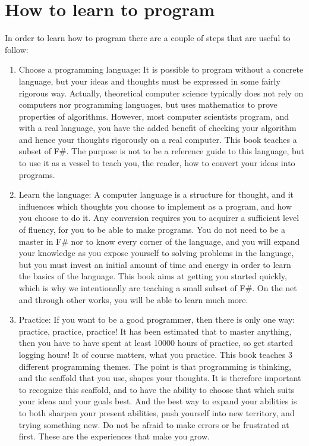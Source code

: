 \section{How to learn to program}
In order to learn how to program there are a couple of steps that are useful to follow:
\begin{enumerate}
\item Choose a programming language: It is possible to program without a concrete language, but your ideas and thoughts must be expressed in some fairly rigorous way. Actually, theoretical computer science typically does not rely on computers nor programming languages, but uses mathematics to prove properties of algorithms. However, most computer scientists program, and with a real language, you have the added benefit of checking your algorithm and hence your thoughts rigorously on a real computer. This book teaches a subset of F\#. The purpose is not to be a reference guide to this language, but to use it as a vessel to teach you, the reader, how to convert your ideas into programs.
\item Learn the language: A computer language is a structure for thought, and it influences which thoughts you choose to implement as a program, and how you choose to do it. Any conversion requires you to acquirer a sufficient level of fluency, for you to be able to make programs. You do not need to be a master in F\# nor to know every corner of the language, and you will expand your knowledge as you expose yourself to solving problems in the language, but you must invest an initial amount of time and energy in order to learn the basics of the language. This book aims at getting you started quickly, which is why we intentionally are teaching a small subset of F\#. On the net and through other works, you will be able to learn much more.
\item Practice: If you want to be a good programmer, then there is only one way: practice, practice, practice! It has been estimated that to master anything, then you have to have spent at least 10000 hours of practice, so get started logging hours! It of course matters, what you practice. This book teaches 3 different programming themes. The point is that programming is thinking, and the scaffold that you use, shapes your thoughts. It is therefore important to recognize this scaffold, and to have the ability to choose that which suits your ideas and your goals best. And the best way to expand your abilities is to both sharpen your present abilities, push yourself into new territory, and trying something new. Do not be afraid to make errors or be frustrated at first. These are the experiences that make you grow.

\end{enumerate}
